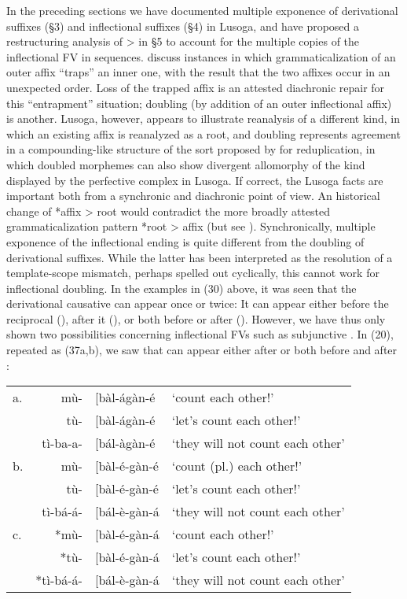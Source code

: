 \documentclass[output=paper,
modfonts
]{LSP/langsci}
\begin{document}
In the preceding sections we have documented multiple exponence of
derivational suffixes (§3) and inflectional suffixes (§4) in Lusoga, and
have proposed a restructuring analysis of  \textgreater{}
 in §5 to account for the multiple copies of the
inflectional FV in  sequences. \citet{harris2006}
discuss instances in which grammaticalization of an outer affix
``traps'' an inner one, with the result that the two affixes occur in an
unexpected order. Loss of the trapped affix is an attested diachronic
repair for this ``entrapment'' situation; doubling (by addition of an
outer inflectional affix) is another. Lusoga, however, appears to
illustrate reanalysis of a different kind, in which an existing affix is
reanalyzed as a root, and doubling represents agreement in a
compounding-like structure of the sort proposed by \citet{inkelas2005} for reduplication, in which doubled morphemes can also show
divergent allomorphy of the kind displayed by the perfective complex in
Lusoga. If correct, the Lusoga facts are important both from a
synchronic and diachronic point of view. An historical change of *affix
\textgreater{} root would contradict the more broadly attested
grammaticalization pattern *root \textgreater{} affix (but see \citet{norde2009}). Synchronically, multiple exponence of the inflectional ending is
quite different from the doubling of derivational suffixes. While the
latter has been interpreted as the resolution of a template-scope
mismatch, perhaps spelled out cyclically, this cannot work for
inflectional doubling. In the examples in (30) above, it was seen that
the derivational causative  can appear once or twice: It can
appear either before the reciprocal (), after it
(), or both before or after (). However,
we have thus only shown two possibilities concerning inflectional FVs
such as subjunctive . In (20), repeated as (37a,b), we saw that
 can appear either after  or both before and after
:

\ea \begin{tabular}[t]{@{}lr@{}ll}
a. & mù- & {[}bàl-ágàn-é & `count each other!' \\
 & tù- &{[}bàl-ágàn-é & `let's count each other!' \\
 & tì-ba-a- &{[}bál-àgàn-é  & `they will not count each other' \\
b. & mù- &{[}bàl-é-gàn-é & `count (pl.) each other!' \\
 & tù- &{[}bàl-é-gàn-é & `let's count each other!' \\
 & tì-bá-á- &{[}bál-è-gàn-á & `they will not count each other'\\
c. & *mù- &{[}bàl-é-gàn-á & `count each other!' \\
 & *tù- &{[}bàl-é-gàn-á & `let's count each other!' \\
 & *tì-bá-á- &{[}bál-è-gàn-á & `they will not count each other'
\end{tabular}
\z
\end{document}
